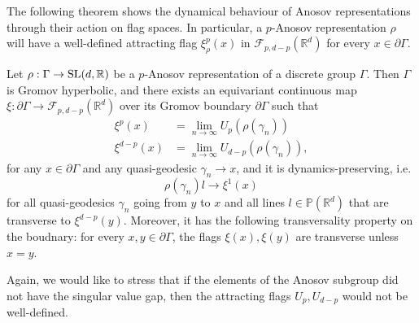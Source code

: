 \documentclass{report}
\begin{document}
The following theorem shows the dynamical behaviour of Anosov representations through their action on flag spaces.
In particular, a $p$-Anosov representation $\rho$ will have a well-defined attracting flag $\xi^p_\rho(x)$ in $\mathcal F_{p, d-p}(\mathbb R^d)$ for every $x \in \partial \Gamma$.
\begin{theorem}\label{thm:boundary_map}
    Let $\rho: \Gamma \to \operatorname{{\mathrm{SL}}}(d, \mathbb R)$ be a $p$-Anosov representation of a discrete group $\Gamma$.
    Then $\Gamma$ is Gromov hyperbolic, and there exists an equivariant continuous map $\xi: \partial \Gamma \to \mathcal F_{p, d-p}(\mathbb R^d) $ over its Gromov boundary $\partial \Gamma$ such that
    \begin{align*}
        \xi^p(x) &= \lim_{n \to \infty} U_p(\rho(\gamma_n))\\
        \xi^{d-p}(x) &= \lim_{n \to \infty} U_{d-p}(\rho(\gamma_n)),
    \end{align*}
    for any $x \in \partial \Gamma$ and any quasi-geodesic $\gamma_n \to x$, and
    it is dynamics-preserving, i.e.
    \[
    \rho(\gamma_n) l \to \xi^1(x)
    \]
    for all quasi-geodesics $\gamma_n$ going from $y$ to $x$ and all lines $l \in \mathbb P(\mathbb R^d)$ that are transverse to $\xi^{d-p}(y)$.
    Moreover, it has the following transversality property on the boudnary: for every $x, y \in \partial \Gamma$, the flags $\xi(x), \xi(y)$ are transverse unless $x=y$.
\end{theorem}
Again, we would like to stress that if the elements of the Anosov subgroup did not have the singular value gap, then the attracting flags $U_p, U_{d-p}$ would not be well-defined.
\end{document}
